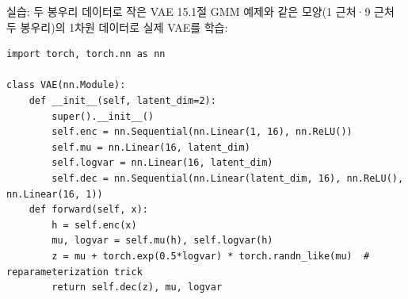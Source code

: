 \documentclass[aspectratio=169,11pt]{beamer}
\begin{document}

\begin{frame}[fragile]{실습: 두 봉우리 데이터로 작은 VAE}
  15.1절 GMM 예제와 같은 모양(1 근처·9 근처 두 봉우리)의 1차원 데이터로
  실제 VAE를 학습:
\begin{lstlisting}
import torch, torch.nn as nn

class VAE(nn.Module):
    def __init__(self, latent_dim=2):
        super().__init__()
        self.enc = nn.Sequential(nn.Linear(1, 16), nn.ReLU())
        self.mu = nn.Linear(16, latent_dim)
        self.logvar = nn.Linear(16, latent_dim)
        self.dec = nn.Sequential(nn.Linear(latent_dim, 16), nn.ReLU(), nn.Linear(16, 1))
    def forward(self, x):
        h = self.enc(x)
        mu, logvar = self.mu(h), self.logvar(h)
        z = mu + torch.exp(0.5*logvar) * torch.randn_like(mu)  # reparameterization trick
        return self.dec(z), mu, logvar
\end{lstlisting}
\end{frame}
\end{document}

